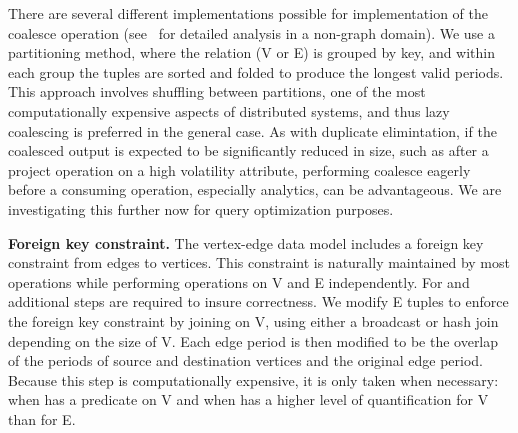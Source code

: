 There are several different implementations possible for
implementation of the coalesce operation
(see~\cite{DBLP:conf/vldb/BohlenSS96} for detailed analysis in a
non-graph domain).  We use a partitioning method, where the relation
(V or E) is grouped by key, and within each group the tuples are
sorted and folded to produce the longest valid periods.  This approach
involves shuffling between partitions, one of the most computationally
expensive aspects of distributed systems, and thus lazy coalescing is
preferred in the general case.  As with duplicate elimintation, if the
coalesced output is expected to be significantly reduced in size, such
as after a project operation on a high volatility attribute,
performing coalesce eagerly before a consuming operation, especially
analytics, can be advantageous.  We are investigating this further now
for query optimization purposes.

{\bf Foreign key constraint.}  The vertex-edge data model includes a
foreign key constraint from edges to vertices.  This constraint is
naturally maintained by most operations while performing operations on
V and E independently.  For  and 
additional steps are required to insure correctness.  We modify E
tuples to enforce the foreign key constraint by joining on V, using
either a broadcast or hash join depending on the size of V.  Each edge
period is then modified to be the overlap of the periods of source and
destination vertices and the original edge period.  Because this step
is computationally expensive, it is only taken when necessary: when
 has a predicate on V and when  has a
higher level of quantification for V than for E.
